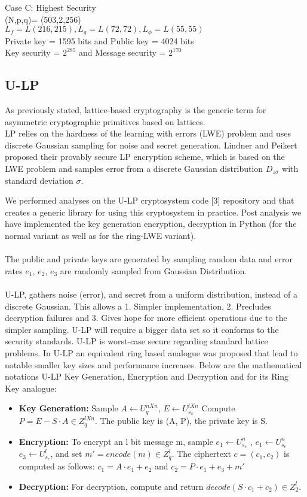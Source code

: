 \documentclass[conference]{IEEEtran}
\begin{document}
 Case C: Highest Security
 \\
(N,p,q)= (503,2,256)\\
 $L_f = L(216,215) , L_g = L(72,72), L_\phi = L(55,55) $\\
 Private key = 1595 bits and Public key = 4024 bits\\
 Key security = $2^{285}$ and Message security = $2^{170}$\\
 
\subsection{U-LP}
As previously stated, lattice-based cryptography is the generic term for asymmetric cryptographic primitives based on lattices.\\
LP relies on the hardness of the learning with errors (LWE) problem and uses discrete Gaussian sampling for noise and secret generation. Lindner and Peikert proposed their provably secure LP encryption scheme, which is based on the LWE problem and samples error from a discrete Gaussian distribution $D_{z\sigma}$ with standard deviation $\sigma$.

We performed analyses on the U-LP cryptosystem code [3] repository and that creates a generic library for using this cryptosystem in practice. Post analysis we have implemented the key generation encryption, decryption in Python (for the normal variant as well as for the ring-LWE variant). \\
\\
The public and private keys are generated by sampling random data and error rates $e_1$, $e_2$, $e_3$ are randomly sampled from Gaussian Distribution.\\
\\

U-LP, gathers noise (error), and secret from a uniform distribution, instead of a discrete Gaussian. This allows a 1. Simpler implementation, 2. Precludes decryption failures and 3. Gives hope for more efficient operations due to the simpler sampling. U-LP will require a bigger data set so it conforms to the security standards. U-LP is worst-case secure regarding standard lattice problems.
In U-LP an equivalent ring based analogue was proposed that lead to notable smaller key sizes and performance increases.
Below are the mathematical notations U-LP Key Generation, Encryption and Decryption and for its Ring Key analogue:

\begin{itemize}
    \item \textbf{Key Generation:}
    Sample $A\leftarrow U^{nXn}_q$, $E\leftarrow U_{s_k}^{lXn}$ Compute $P=E-S·A \in Z_q^{lXn}$.
The public key is (A, P), the private key is S.
\item \textbf{Encryption:}
To encrypt an l bit message m, sample $e_1 \leftarrow U_{s_e}^n$ , $e_1 \leftarrow U_{s_e}^n$ $e_3\leftarrow U_{s_e}^l$, and set
$m' = encode(m) \in Z_q^l$. The ciphertext $c = (c_1, c_2)$ is computed as follows: $c_1 = A · e_1 + e_2$ and $c_2 = P·e_1 + e_3 + m'$
\item \textbf{Decryption:}
For decryption, compute and return $decode(S·c_1 + c_2) \in  Z_2^l$.
\end{itemize}
\end{document}
